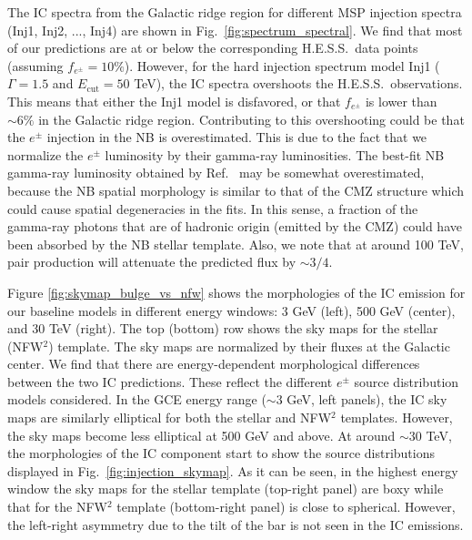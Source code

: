 \documentclass[doublespace,nopageskip]{VTthesis} %
\begin{document}
The IC spectra from the Galactic ridge region for different MSP injection spectra (Inj1, Inj2, ..., Inj4) are shown in Fig.~\ref{fig:spectrum_spectral}. We find that most of our predictions are at or below the corresponding H.E.S.S.~data points (assuming $f_{e^\pm} = 10\%$). However, for the hard injection spectrum model Inj1 ($\Gamma = 1.5$ and $E_{\text{cut}}=50$ TeV), the IC spectra overshoots the H.E.S.S.~observations. This means that either the Inj1 model is disfavored, or that $f_{e^\pm}$ is lower than $\sim 6\%$ in the Galactic ridge region. Contributing to this overshooting could be that the $e^\pm$ injection in the NB is overestimated. This is due to the fact that we normalize the $e^\pm$ luminosity by their gamma-ray luminosities. The best-fit NB gamma-ray luminosity obtained by Ref.~\cite{Macias:2016nev} may be somewhat overestimated, because the NB spatial morphology is similar to that of the CMZ structure which could cause spatial degeneracies in the fits. In this sense, a fraction of the gamma-ray photons that are of hadronic origin (emitted by the CMZ) could have been absorbed by the NB stellar template. Also, we note that at around 100 TeV, pair production will attenuate the predicted flux by $\sim 3/4$.

Figure \ref{fig:skymap_bulge_vs_nfw} shows the morphologies of the IC emission for our baseline models in different energy windows: 3 GeV (left), 500 GeV (center), and 30 TeV (right). The top (bottom) row shows the sky maps for the stellar (NFW$^2$) template. The sky maps are normalized by their fluxes at the Galactic center. We find that there are energy-dependent morphological differences between the two IC predictions. These reflect the different $e^\pm$ source distribution models considered. In the GCE energy range ($\sim 3$ GeV, left panels), the IC sky maps are similarly elliptical for both the stellar and NFW$^2$ templates. However, the sky maps become less elliptical at 500 GeV and above. At around $\sim 30$ TeV, the morphologies of the IC component start to show the source distributions displayed in Fig.~\ref{fig:injection_skymap}. As it can be seen, in the highest energy window the sky maps for the stellar template (top-right panel) are boxy while that for the NFW$^2$ template (bottom-right panel) is close to spherical. However, the left-right asymmetry due to the tilt of the bar is not seen in the IC emissions.
\end{document}
